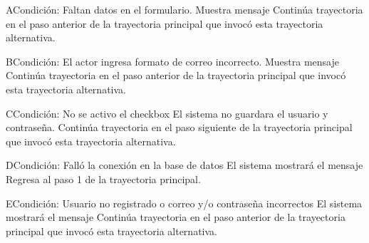 	\begin{UCtrayectoriaA}{A}{Condición: Faltan datos en el formulario.}
		\UCpaso[\UCsist] Muestra mensaje 
		\UCpaso[\UCsist] Continúa trayectoria en el paso anterior de la trayectoria principal que invocó esta trayectoria alternativa. 
	\end{UCtrayectoriaA}
	\begin{UCtrayectoriaA}{B}{Condición: El actor ingresa formato de correo incorrecto.}
		\UCpaso[\UCsist] Muestra mensaje 
		\UCpaso[\UCsist] Continúa trayectoria en el paso anterior de la trayectoria principal que invocó esta trayectoria alternativa. 
	\end{UCtrayectoriaA}
	\begin{UCtrayectoriaA}{C}{Condición: No se activo el checkbox}
		\UCpaso[\UCsist] El sistema no guardara el usuario y contraseña. 
		\UCpaso[\UCsist] Continúa trayectoria en el paso siguiente de la trayectoria principal que invocó esta trayectoria alternativa. 
	\end{UCtrayectoriaA}
	\begin{UCtrayectoriaA}{D}{Condición: Falló la conexión en la base de datos}
		\UCpaso[\UCsist] El sistema mostrará el mensaje 
		\UCpaso[\UCsist] Regresa al paso 1 de la trayectoria principal. 
	\end{UCtrayectoriaA}
		\begin{UCtrayectoriaA}{E}{Condición: Usuario no registrado o correo y/o contraseña incorrectos}
			\UCpaso[\UCsist] El sistema mostrará el mensaje 
			\UCpaso[\UCsist] Continúa trayectoria en el paso anterior de la trayectoria principal que invocó esta trayectoria alternativa. 
	\end{UCtrayectoriaA}